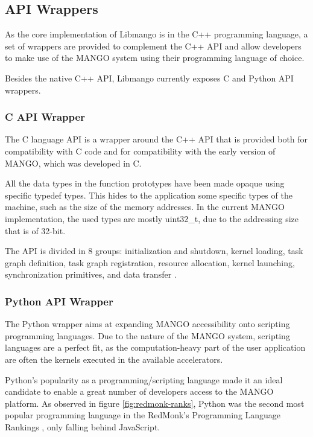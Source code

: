 \subsection{API Wrappers}
As the core implementation of Libmango is in the C++ programming language, a set of wrappers are provided to complement the C++ API and allow developers to make use of the MANGO system using their programming language of choice.

Besides the native C++ API, Libmango currently exposes C and Python API wrappers.

\subsubsection{C API Wrapper}

The C language API is a wrapper around the C++ API that is provided both for compatibility with C code and for compatibility with the early version of MANGO, which was developed in C.

All the data types in the function prototypes have been made opaque using specific typedef types. This hides to the application some specific types of the machine, such as the size of the memory addresses. In the current MANGO implementation, the used types are mostly uint32\_t, due to the addressing size that is of 32-bit.

The API is divided in 8 groups: initialization and shutdown, kernel loading, task graph definition, task graph registration, resource allocation, kernel launching, synchronization primitives, and data transfer \cite{mango_exploring_manycore_architectures}.

\subsubsection{Python API Wrapper} \label{python_wrapper}

The Python wrapper aims at expanding MANGO accessibility onto scripting programming languages. Due to the nature of the MANGO system, scripting languages are a perfect fit, as the computation-heavy part of the user application are often the kernels executed in the available accelerators.

Python's popularity as a programming/scripting language made it an ideal candidate to enable a great number of developers access to the MANGO platform. As observed in figure \ref{fig:redmonk-ranks}, Python was the second most popular programming language in the RedMonk's Programming Language Rankings \cite{redmonks_rankings}, only falling behind JavaScript.

